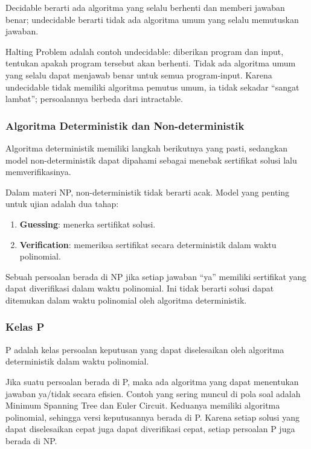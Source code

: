 \begin{jawab}
Decidable berarti ada algoritma yang selalu berhenti dan memberi jawaban benar; undecidable berarti tidak ada algoritma umum yang selalu memutuskan jawaban.
\end{jawab}

Halting Problem adalah contoh undecidable: diberikan program dan input, tentukan apakah program tersebut akan berhenti. Tidak ada algoritma umum yang selalu dapat menjawab benar untuk semua program-input. Karena undecidable tidak memiliki algoritma pemutus umum, ia tidak sekadar ``sangat lambat''; persoalannya berbeda dari intractable.

\subsubsection{Algoritma Deterministik dan Non-deterministik}

\begin{jawab}
Algoritma deterministik memiliki langkah berikutnya yang pasti, sedangkan model non-deterministik dapat dipahami sebagai menebak sertifikat solusi lalu memverifikasinya.
\end{jawab}

Dalam materi NP, non-deterministik tidak berarti acak. Model yang penting untuk ujian adalah dua tahap:
\begin{enumerate}
    \item \textbf{Guessing}: menerka sertifikat solusi.
    \item \textbf{Verification}: memeriksa sertifikat secara deterministik dalam waktu polinomial.
\end{enumerate}

Sebuah persoalan berada di NP jika setiap jawaban ``ya'' memiliki sertifikat yang dapat diverifikasi dalam waktu polinomial. Ini tidak berarti solusi dapat ditemukan dalam waktu polinomial oleh algoritma deterministik.

\subsubsection{Kelas P}

\begin{jawab}
P adalah kelas persoalan keputusan yang dapat diselesaikan oleh algoritma deterministik dalam waktu polinomial.
\end{jawab}

Jika suatu persoalan berada di P, maka ada algoritma yang dapat menentukan jawaban ya/tidak secara efisien. Contoh yang sering muncul di pola soal adalah Minimum Spanning Tree dan Euler Circuit. Keduanya memiliki algoritma polinomial, sehingga versi keputusannya berada di P. Karena setiap solusi yang dapat diselesaikan cepat juga dapat diverifikasi cepat, setiap persoalan P juga berada di NP.

